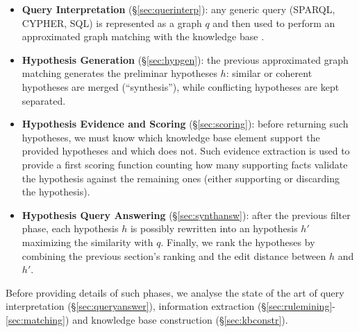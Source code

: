 \begin{itemize}
\item \textbf{Query Interpretation} (\S\ref{sec:querinterp}): any generic query (SPARQL, CYPHER, SQL) is represented as a graph $q$ \cite{Hu0YWZ18} and then used to perform an approximated graph matching with the knowledge base \cite{DeVirgilio2015}.
\item \textbf{Hypothesis Generation} (\S\ref{sec:hypgen}): the previous approximated graph matching generates the preliminar hypotheses $h$: similar or coherent hypotheses are merged (``synthesis''), while conflicting hypotheses are kept separated. %
\item \textbf{Hypothesis Evidence and Scoring} (\S\ref{sec:scoring}): before returning such hypotheses, we must know which knowledge base element support the provided hypotheses and which does not. Such evidence extraction is used to provide a first scoring function counting how many supporting facts validate the hypothesis against the remaining ones (either supporting or discarding the hypothesis).
\item \textbf{Hypothesis Query Answering} (\S\ref{sec:synthansw}): after the previous filter phase, each hypothesis $h$ is possibly rewritten into an hypothesis $h'$ maximizing the similarity with $q$. Finally, we rank the hypotheses by combining the previous section's ranking and the edit distance between $h$ and $h'$.
\end{itemize} 



Before providing details of such phases, we analyse the state of the art of query interpretation (\S\ref{sec:queryanswer}), information extraction (\S\ref{sec:rulemining}-\ref{sec:matching}) and knowledge base construction (\S\ref{sec:kbconstr}).

